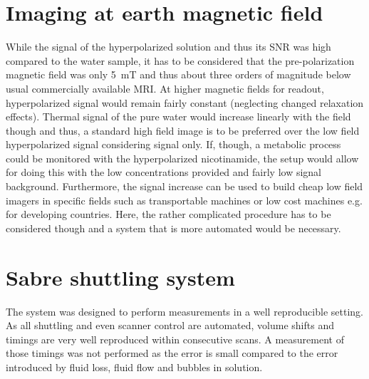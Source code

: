     \section{Imaging at earth magnetic field}
        While the signal of the hyperpolarized solution and thus its SNR was high compared to the water sample, it has to be considered that the pre-polarization magnetic field was only \SI{5}{\milli\tesla} and thus about three orders of magnitude below usual commercially available MRI. At higher magnetic fields for readout, hyperpolarized signal would remain fairly constant (neglecting changed relaxation effects). Thermal signal of the pure water would increase linearly with the field though and thus, a standard high field image is to be preferred over the low field hyperpolarized signal considering signal only. If, though, a metabolic process could be monitored with the hyperpolarized nicotinamide, the setup would allow for doing this with the low concentrations provided and fairly low signal background. Furthermore, the signal increase can be used to build cheap low field imagers in specific fields such as transportable machines or low cost machines e.g. for developing countries. Here, the rather complicated procedure has to be considered though and a system that is more automated would be necessary.
    \section{Sabre shuttling system}
        The system was designed to perform measurements in a well reproducible setting. As all shuttling and even scanner control are automated, volume shifts and timings are very well reproduced within consecutive scans. A measurement of those timings was not performed as the error is small compared to the error introduced by fluid loss, fluid flow and bubbles in solution.
